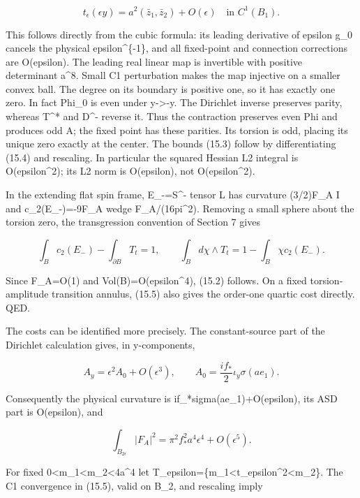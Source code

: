 \documentclass[
  10pt,
]{article}
\begin{document}
\[
        t_\epsilon(\epsilon y)
           =a^2(\bar z_1,\bar z_2)+O(\epsilon)
                                      \quad\text{in }C^1(B_1).
                                                               \tag{15.5}
\]

This follows directly from the cubic formula: its leading derivative of
epsilon g\_0 cancels the physical epsilon\^{}\{-1\}, and all fixed-point
and connection corrections are O(epsilon). The leading real linear map
is invertible with positive determinant a\^{}8. Small C1 perturbation
makes the map injective on a smaller convex ball. The degree on its
boundary is positive one, so it has exactly one zero. In fact Phi\_0 is
even under y-\textgreater-y. The Dirichlet inverse preserves parity,
whereas T\^{}* and D\^{}- reverse it. Thus the contraction preserves
even Phi and produces odd A; the fixed point has these parities. Its
torsion is odd, placing its unique zero exactly at the center. The
bounds (15.3) follow by differentiating (15.4) and rescaling. In
particular the squared Hessian L2 integral is O(epsilon\^{}2); its L2
norm is O(epsilon), not O(epsilon\^{}2).

In the extending flat spin frame, E\_-=S\^{}- tensor L has curvature
(3/2)F\_A I and c\_2(E\_-)=-9F\_A wedge F\_A/(16pi\^{}2). Removing a
small sphere about the torsion zero, the transgression convention of
Section 7 gives

\[
 \int_B c_2(E_-)-\int_{\partial B}T_t=1,
 \qquad
 \int_B d\chi\wedge T_t=1-\int_B\chi c_2(E_-).
\]

Since F\_A=O(1) and Vol(B)=O(epsilon\^{}4), (15.2) follows. On a fixed
torsion-amplitude transition annulus, (15.5) also gives the order-one
quartic cost directly. QED.

The costs can be identified more precisely. The constant-source part of
the Dirichlet calculation gives, in y-components,

\[
 A_y=\epsilon^2 A_0+O(\epsilon^3),\qquad
 A_0=\frac{if_*}{2}\iota_y\sigma(ae_1).
\]

Consequently the physical curvature is if\_*sigma(ae\_1)+O(epsilon), its
ASD part is O(epsilon), and

\[
 \int_{B_{2\epsilon}}|F_A|^2
    =\pi^2f_*^2a^4\epsilon^4+O(\epsilon^5).
                                                               \tag{15.6}
\]

For fixed 0\textless m\_1\textless m\_2\textless4a\^{}4 let
T\_epsilon=\{m\_1\textless\textbar t\_epsilon\textbar\^{}2\textless m\_2\}.
The C1 convergence in (15.5), valid on B\_2, and rescaling imply
\end{document}
